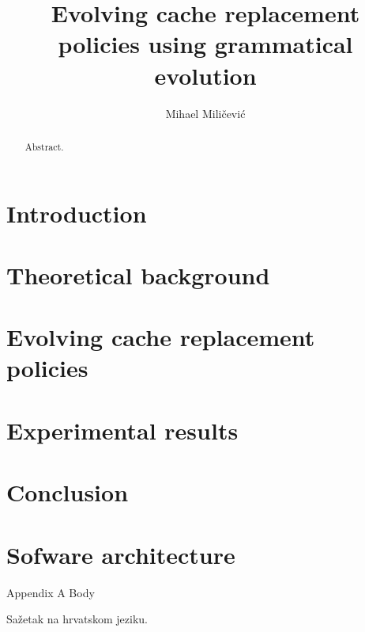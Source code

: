 \documentclass[times, utf8, zavrsni]{fer}
\begin{document}

\title{Evolving cache replacement policies using grammatical evolution}

\author{Mihael Miličević}

\maketitle

\izvornik

\zahvala{}

\tableofcontents

\chapter{Introduction}

\chapter{Theoretical background}







\chapter{Evolving cache replacement policies}





\chapter{Experimental results}

\chapter{Conclusion}






\appendix
\chapter{Sofware architecture}
Appendix A Body


\begin{sazetak}
Sažetak na hrvatskom jeziku.

\end{sazetak}

\begin{abstract}
Abstract.

\end{abstract}
\end{document}

